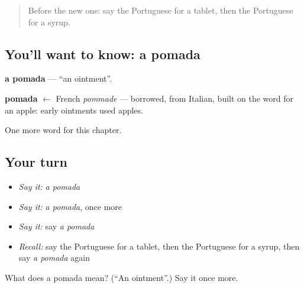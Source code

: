 \label{lesson:PT-C210-pomada}



\begin{quote}
Before the new one: say the Portuguese for a tablet, then the Portuguese for a syrup.
\end{quote}

\subsection*{You'll want to know: a pomada}
\textbf{a pomada} — \textquotedblleft{}an ointment\textquotedblright{}.

\begin{cousinweb}
\textbf{pomada} $\leftarrow$ French \emph{pommade} — borrowed, from Italian, built on the word for an apple: early ointments used apples.
\end{cousinweb}

\begin{grammarlens}[title={What you've built}]
One more word for this chapter.
\end{grammarlens}

\subsection*{Your turn}
\begin{itemize}
\raggedright
  \item \emph{Say it:} \emph{a pomada}
  \item \emph{Say it:} \emph{a pomada}, once more
  \item \emph{Say it:} say \emph{a pomada}
  \item \emph{Recall:} say the Portuguese for a tablet, then the Portuguese for a syrup, then say \emph{a pomada} again
\end{itemize}

\begin{tcolorbox}[breakable,colback=teal!4,colframe=teal!35!black,title={Before you move on}]
What does a pomada mean? (\textquotedblleft{}An ointment\textquotedblright{}.) Say it once more.
\end{tcolorbox}
